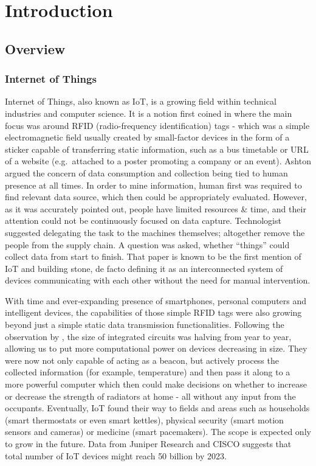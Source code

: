 \chapter{Introduction\label{chap:introduction}}

\section{Overview}
\subsection{Internet of Things}
Internet of Things, also known as IoT, is a growing field within technical industries and computer science. It is a notion first coined in \citet{ashton1999introduction} where the main focus was around RFID (radio-frequency identification) tags - which was a simple electromagnetic field usually created by small-factor devices in the form of a sticker capable of transferring static information, such as a bus timetable or URL of a website (e.g.\ attached to a poster promoting a company or an event). Ashton argued the concern of data consumption and collection being tied to human presence at all times. In order to mine information, human first was required to find relevant data source, which then could be appropriately evaluated. However, as it was accurately pointed out, people have limited resources \& time, and their attention could not be continuously focused on data capture. Technologist suggested delegating the task to the machines themselves; altogether remove the people from the supply chain. A question was asked, whether ``things'' could collect data from start to finish. That paper is known to be the first mention of IoT and building stone, de facto defining it as an interconnected system of devices communicating with each other without the need for manual intervention.

With time and ever-expanding presence of smartphones, personal computers and intelligent devices, the capabilities of those simple RFID tags were also growing beyond just a simple static data transmission functionalities. Following the observation by \citet{moore1965cramming}, the size of integrated circuits was halving from year to year, allowing us to put more computational power on devices decreasing in size. They were now not only capable of acting as a beacon, but actively process the collected information (for example, temperature) and then pass it along to a more powerful computer which then could make decisions on whether to increase or decrease the strength of radiators at home - all without any input from the occupants. Eventually, IoT found their way to fields and areas such as households (smart thermostats or even smart kettles), physical security (smart motion sensors and cameras) or medicine (smart pacemakers). The scope is expected only to grow in the future. Data from Juniper Research \cite{sorrel2018internet} and CISCO \cite{evans2011internet} suggests that total number of IoT devices might reach 50 billion by 2023.

